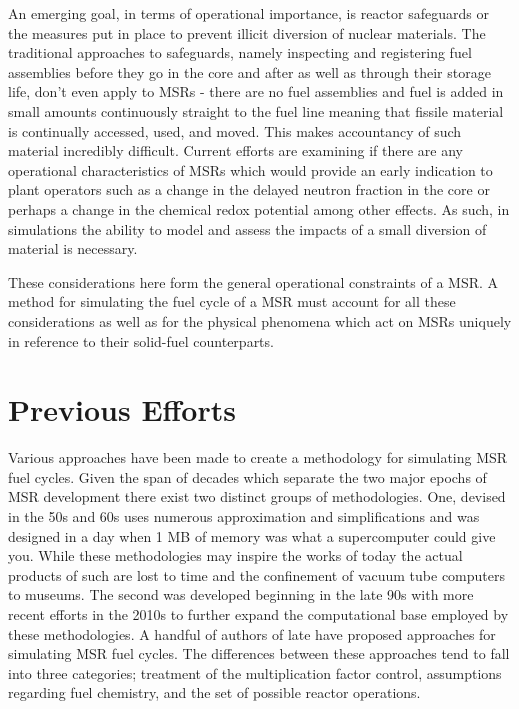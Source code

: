 An emerging goal, in terms of operational importance, is reactor safeguards or
the measures put in place to prevent illicit diversion of nuclear materials.
The traditional approaches to safeguards, namely inspecting and registering
fuel assemblies before they go in the core and after as well as through their
storage life, don't even apply to MSRs - there are no fuel assemblies and fuel
is added in small amounts continuously straight to the fuel line meaning that
fissile material is continually accessed, used, and moved. This makes
accountancy of such material incredibly difficult. Current efforts are examining
if there are any operational characteristics of MSRs which would provide an
early indication to plant operators such as a change in the delayed neutron
fraction in the core or perhaps a change in the chemical redox potential among
other effects. As such, in simulations the ability to model and assess the
impacts of a small diversion of material is necessary.

These considerations here form the general operational constraints of a MSR. A
method for simulating the fuel cycle of a MSR must account for all these
considerations as well as for the physical phenomena which act on MSRs
uniquely in reference to their solid-fuel counterparts.

\section{Previous Efforts}\label{ssec:efforts}

Various approaches have been made to create a methodology for simulating MSR
fuel cycles. Given the span of decades which separate the two major epochs of
MSR development there exist two distinct groups of methodologies. One, devised
in the 50s and 60s uses numerous approximation and simplifications and was
designed in a day when 1 MB of memory was what a supercomputer could give you.
While these methodologies may inspire the works of today the actual products of
such are lost to time and the confinement of vacuum tube computers to museums.
The second was developed beginning in the late 90s with more recent efforts in
the 2010s to further expand the computational base employed by these
methodologies. A handful of authors of late have proposed approaches for
simulating MSR fuel cycles. The differences between these approaches tend to
fall into three categories; treatment of the multiplication factor control,
assumptions regarding fuel chemistry, and the set of possible reactor
operations.

